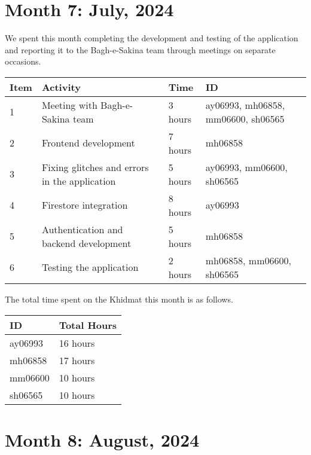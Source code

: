 \documentclass{article}
\begin{document}
\newpage
\section*{Month 7: July, 2024}

We spent this month completing the development and testing of the application and reporting it to the Bagh-e-Sakina team through meetings on separate occasions. 

\vspace{1em}

\noindent \begin{tabular}{|l|l|l|l|}
  \hline
  Item & Activity & Time & ID \\ \hline
  1 & Meeting with Bagh-e-Sakina team & 3 hours & ay06993, mh06858, mm06600, sh06565 \\ \hline
  2 & Frontend development & 7 hours  & mh06858 \\ \hline
  3 & Fixing glitches and errors in the application & 5 hours  & ay06993, mm06600, sh06565 \\ \hline
  4 & Firestore integration & 8 hours & ay06993 \\ \hline
  5 & Authentication and backend development & 5 hours & mh06858 \\ \hline
  6 & Testing the application & 2 hours & mh06858, mm06600, sh06565 \\ \hline

\end{tabular}

\vspace{1em}

\noindent The total time spent on the Khidmat this month is as follows.

\vspace{1em}

\noindent \begin{tabular}{|l|l|}
  \hline
  ID & Total Hours \\\hline
  ay06993 & 16 hours \\ \hline
  mh06858 & 17 hours  \\ \hline
  mm06600 & 10 hours \\ \hline
  sh06565 & 10 hours \\ \hline
\end{tabular}

\newpage

\section*{Month 8: August, 2024}
\end{document}
